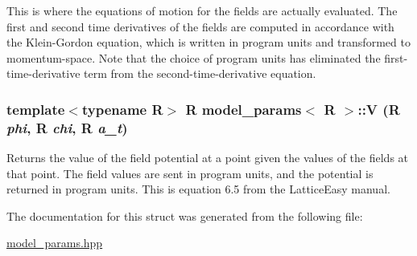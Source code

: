 This is where the equations of motion for the fields are actually evaluated. The first and second time derivatives of the fields are computed in accordance with the Klein-\/Gordon equation, which is written in program units and transformed to momentum-\/space. Note that the choice of program units has eliminated the first-\/time-\/derivative term from the second-\/time-\/derivative equation. \hypertarget{structmodel__params_a2ca88aaf39658ce4bbe31cf92654040b}{
\subsubsection[{V}]{\setlength{\rightskip}{0pt plus 5cm}template$<$typename R$>$ R {\bf model\_\-params}$<$ R $>$::V (R {\em phi}, \/  R {\em chi}, \/  R {\em a\_\-t})}}
\label{structmodel__params_a2ca88aaf39658ce4bbe31cf92654040b}


Returns the value of the field potential at a point given the values of the fields at that point. The field values are sent in program units, and the potential is returned in program units. This is equation 6.5 from the LatticeEasy manual. 

The documentation for this struct was generated from the following file:\begin{DoxyCompactItemize}
\item 
\hyperlink{model__params_8hpp}{model\_\-params.hpp}\end{DoxyCompactItemize}
